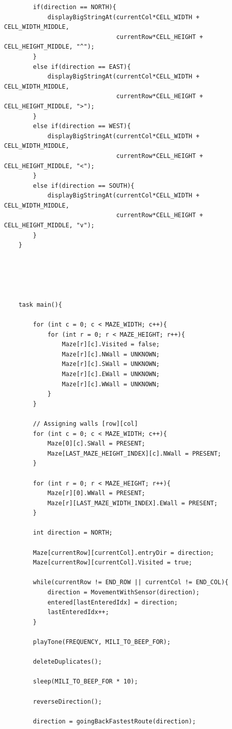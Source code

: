 \documentclass[11pt]{article}
\begin{document}
\begin{linenumbers}
\begin{verbatim}
        if(direction == NORTH){
            displayBigStringAt(currentCol*CELL_WIDTH + CELL_WIDTH_MIDDLE, 
                               currentRow*CELL_HEIGHT + CELL_HEIGHT_MIDDLE, "^");
        }
        else if(direction == EAST){
            displayBigStringAt(currentCol*CELL_WIDTH + CELL_WIDTH_MIDDLE,
                               currentRow*CELL_HEIGHT + CELL_HEIGHT_MIDDLE, ">");
        }
        else if(direction == WEST){
            displayBigStringAt(currentCol*CELL_WIDTH + CELL_WIDTH_MIDDLE,
                               currentRow*CELL_HEIGHT + CELL_HEIGHT_MIDDLE, "<");
        }
        else if(direction == SOUTH){
            displayBigStringAt(currentCol*CELL_WIDTH + CELL_WIDTH_MIDDLE,
                               currentRow*CELL_HEIGHT + CELL_HEIGHT_MIDDLE, "v");
        }
    }





    task main(){

        for (int c = 0; c < MAZE_WIDTH; c++){
            for (int r = 0; r < MAZE_HEIGHT; r++){
                Maze[r][c].Visited = false;
                Maze[r][c].NWall = UNKNOWN;
                Maze[r][c].SWall = UNKNOWN;
                Maze[r][c].EWall = UNKNOWN;
                Maze[r][c].WWall = UNKNOWN;
            }
        }

        // Assigning walls [row][col]
        for (int c = 0; c < MAZE_WIDTH; c++){
            Maze[0][c].SWall = PRESENT;
            Maze[LAST_MAZE_HEIGHT_INDEX][c].NWall = PRESENT;
        }

        for (int r = 0; r < MAZE_HEIGHT; r++){
            Maze[r][0].WWall = PRESENT;
            Maze[r][LAST_MAZE_WIDTH_INDEX].EWall = PRESENT;
        }

        int direction = NORTH;

        Maze[currentRow][currentCol].entryDir = direction;
        Maze[currentRow][currentCol].Visited = true;

        while(currentRow != END_ROW || currentCol != END_COL){
            direction = MovementWithSensor(direction);
            entered[lastEnteredIdx] = direction;
            lastEnteredIdx++;
        }

        playTone(FREQUENCY, MILI_TO_BEEP_FOR);

        deleteDuplicates();

        sleep(MILI_TO_BEEP_FOR * 10);

        reverseDirection();
        
        direction = goingBackFastestRoute(direction);


\end{verbatim}
\end{linenumbers}
\end{document}
